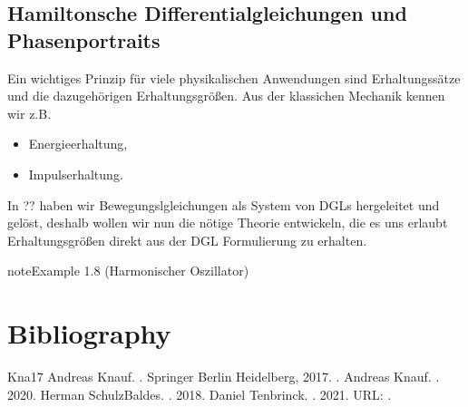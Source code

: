 \documentclass[letterpaper,10pt,english]{jupyterBook}
\begin{document}
\section{Hamiltonsche Differentialgleichungen und Phasenportraits}
\label{\detokenize{ode/hamilton:hamiltonsche-differentialgleichungen-und-phasenportraits}}\label{\detokenize{ode/hamilton::doc}}
\sphinxAtStartPar
Ein wichtiges Prinzip für viele physikalischen Anwendungen sind Erhaltungssätze und die dazugehörigen Erhaltungsgrößen. Aus der klassichen Mechanik kennen wir z.B.
\begin{itemize}
\item {} 
\sphinxAtStartPar
Energieerhaltung,

\item {} 
\sphinxAtStartPar
Impulserhaltung.

\end{itemize}

\sphinxAtStartPar
In ?? haben wir Bewegungslgleichungen als System von DGLs hergeleitet und gelöst, deshalb wollen wir nun die nötige Theorie entwickeln, die es uns erlaubt Erhaltungsgrößen direkt aus der DGL Formulierung zu erhalten.
\label{ode/hamilton:example-0}
\begin{sphinxadmonition}{note}{Example 1.8 (Harmonischer Oszillator)}


\end{sphinxadmonition}


\chapter{Bibliography}
\label{\detokenize{references:bibliography}}\label{\detokenize{references::doc}}
\sphinxAtStartPar


\begin{sphinxthebibliography}{Kna17}
\sphinxAtStartPar
Andreas Knauf. . Springer Berlin Heidelberg, 2017. .
\sphinxAtStartPar
Andreas Knauf. . 2020.
\sphinxAtStartPar
Herman Schulz\sphinxhyphen{}Baldes. . 2018.
\sphinxAtStartPar
Daniel Tenbrinck. . 2021. URL: .
\end{sphinxthebibliography}
\end{document}
